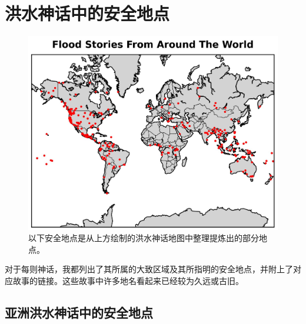 \documentclass[10pt,twocolumn,letterpaper]{article}
\begin{document}
\section{洪水神话中的安全地点}

\begin{figure}[H]
\begin{center}
   \includegraphics[width=1\linewidth]{flood.jpg}
\end{center}
   \caption{以下安全地点是从上方绘制的洪水神话地图中整理提炼出的部分地点\cite{2,17}。}
\label{fig:21}
\label{fig:onecol}
\end{figure}

对于每则神话，我都列出了其所属的大致区域及其所指明的安全地点，并附上了对应故事的链接。这些故事中许多地名看起来已经较为久远或古旧。
\subsection{亚洲洪水神话中的安全地点}
\end{document}
